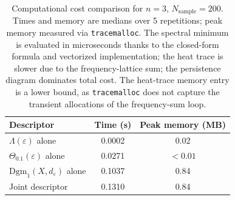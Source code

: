 \begin{table}[htbp]\centering
\caption{Computational cost comparison for \(n = 3\), \(N_{\mathrm{sample}} = 200\).
Times and memory are medians over 5 repetitions; peak memory measured via
\texttt{tracemalloc}. The spectral minimum is evaluated in microseconds thanks
to the closed-form formula and vectorized implementation; the heat trace is
slower due to the frequency-lattice sum; the persistence diagram dominates
total cost. The heat-trace memory entry is a lower bound, as \texttt{tracemalloc}
does not capture the transient allocations of the frequency-sum loop.}
\label{tab:cost-comparison}
\begin{tabular}{lcc}\hline
Descriptor & Time (s) & Peak memory (MB) \\\hline
\(\Lambda(\varepsilon)\) alone & 0.0002 & 0.02 \\
\(\Theta_{0.1}(\varepsilon)\) alone & 0.0271 & \(<0.01\) \\
\(\mathrm{Dgm}_1(X,d_\varepsilon)\) alone & 0.1037 & 0.84 \\
Joint descriptor & 0.1310 & 0.84 \\
\hline\end{tabular}\end{table}